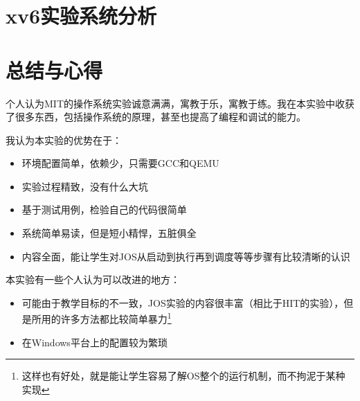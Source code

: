\documentclass[forprint]{WHUBachelor}
\begin{document}








\chapter{xv6实验系统分析}















\chapter{总结与心得}

个人认为MIT的操作系统实验诚意满满，寓教于乐，寓教于练。我在本实验中收获了很多东西，包括操作系统的原理，甚至也提高了编程和调试的能力。

我认为本实验的优势在于：

\begin{itemize}
\item 环境配置简单，依赖少，只需要GCC和QEMU
\item 实验过程精致，没有什么大坑
\item 基于测试用例，检验自己的代码很简单
\item 系统简单易读，但是短小精悍，五脏俱全
\item 内容全面，能让学生对JOS从启动到执行再到调度等等步骤有比较清晰的认识
\end{itemize}

本实验有一些个人认为可以改进的地方：

\begin{itemize}
\item 可能由于教学目标的不一致，JOS实验的内容很丰富（相比于HIT的实验），但是所用的许多方法都比较简单暴力\footnote{这样也有好处，就是能让学生容易了解OS整个的运行机制，而不拘泥于某种实现}
\item 在Windows平台上的配置较为繁琐
\end{itemize}

\cleardoublepage{}
{}








\cleardoublepage
\end{document}
